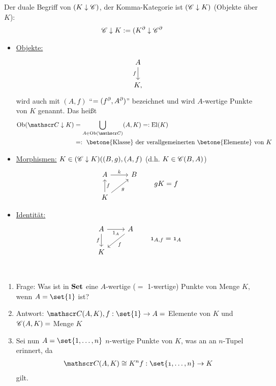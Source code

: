 \begin{folg}
	Der duale Begriff von $(K \downarrow \mathscr C)$, der Komma-Kategorie ist $(\mathscr C \downarrow K)$ (Objekte über $K$): 
	\begin{align*}
		\mathscr C \downarrow K := (K^{\partial} \downarrow \mathscr C^{\partial}
	\end{align*}
	\begin{itemize}
		\item \ul{Objekte:}
		\begin{align*}
			\begin{tikzcd}
				A \arrow[d, "f"'] \\ K,
			\end{tikzcd} 
		\end{align*}
		wird auch mit $(A,f)$ ``$= (f^{\partial}, A^{\partial})$'' bezeichnet und wird $A$-wertige Punkte von $K$ genannt. Das heißt
		\begin{align*}
			\Ob(\Cat \downarrow K) &= \bigcup_{A \in \Ob(\Cat)}(A,K) =: \El(K)\\
			&=: \text{ \betone{Klasse} der verallgemeinerten \betone{Elemente} von } K 
		\end{align*}
		\item \ul{Morphismen:} $K \in (\mathscr C \downarrow K)((B,g),(A,f)$ (d.h. $K \in \mathscr C(B,A)$)
		\begin{align*}
			\begin{tikzcd}[ampersand replacement=\&]
				A \arrow[r, "k"] \& B\\
				K \arrow[u, "f"'] \arrow[ur, "g"'] 
			\end{tikzcd} \qquad \mit gK = f
		\end{align*}
		\item \ul{Identität:}
		\begin{align*}
			\begin{tikzcd}[ampersand replacement=\&]
				A \arrow[d, "f"'] \arrow[r, "1_A"'] \& A \arrow[dl, "f"] \\
				K 
			\end{tikzcd}
			\qquad \mit 1_{A,f} = 1_A
		\end{align*}
	\end{itemize}
\end{folg}

\begin{bemerkung}\
	\begin{enumerate}[label=] %
		\item Frage:  Was ist in $\operatorname{\mathbf{Set}}$ eine $A$-wertige ($=$ 1-wertige) Punkte von Menge $K$, wenn $A = \set{1}$ ist?
		\item Antwort: $\Cat(A,K), f: \set{1} \to A=$ Elemente von $K$ und $\mathscr C(A,K) = $ Menge $K$ %
		\item Sei nun $A = \set{1,\dots, n}$ $n$-wertige Punkte von $K$, was an an $n$-Tupel erinnert, da
		\begin{align*}
			\Cat(A,K) \cong K^n \mit f: \set{1, \dots, n} \to K
		\end{align*}
		gilt.
	\end{enumerate}
\end{bemerkung}